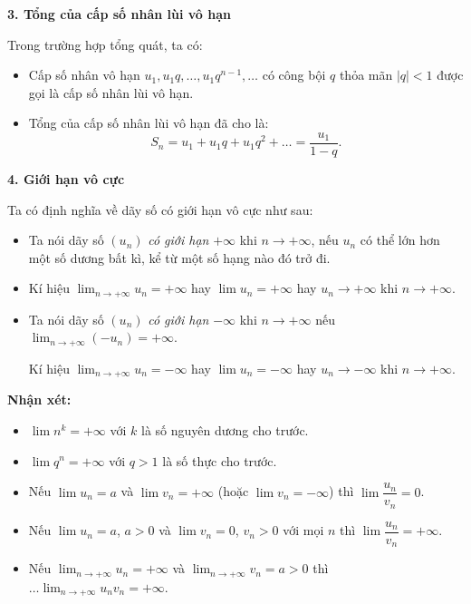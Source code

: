 \documentclass[12pt,a4paper]{extarticle}
\begin{document}
\noindent\textbf{3. Tổng của cấp số nhân lùi vô hạn}

\noindent Trong trường hợp tổng quát, ta có:
\begin{itemize}
    \item Cấp số nhân vô hạn $u_1, u_1q, \dots, u_1q^{n-1}, \dots$ có công bội $q$ thỏa mãn $|q| < 1$ được gọi là cấp số nhân lùi vô hạn.
    \item Tổng của cấp số nhân lùi vô hạn đã cho là:
    \[ S_n = u_1 + u_1q + u_1q^2 + \dots = \frac{u_1}{1 - q}. \]
\end{itemize}

\vspace{0.4cm}
\noindent\textbf{4. Giới hạn vô cực}

\noindent Ta có định nghĩa về dãy số có giới hạn vô cực như sau:
\begin{itemize}
    \item Ta nói dãy số $(u_n)$ \textit{có giới hạn} $+\infty$ khi $n \to +\infty$, nếu $u_n$ có thể lớn hơn một số dương bất kì, kể từ một số hạng nào đó trở đi.
    \item Kí hiệu $\lim_{n \to +\infty} u_n = +\infty$ hay $\lim u_n = +\infty$ hay $u_n \to +\infty$ khi $n \to +\infty$.
    \item Ta nói dãy số $(u_n)$ \textit{có giới hạn} $-\infty$ khi $n \to +\infty$ nếu $\lim_{n \to +\infty} (-u_n) = +\infty$.
    
    Kí hiệu $\lim_{n \to +\infty} u_n = -\infty$ hay $\lim u_n = -\infty$ hay $u_n \to -\infty$ khi $n \to +\infty$.
\end{itemize}
\vspace{0.4cm}
\noindent\textbf{Nhận xét:}
\begin{itemize}
    \item $\lim n^k = +\infty$ với $k$ là số nguyên dương cho trước.
    \item $\lim q^n = +\infty$ với $q > 1$ là số thực cho trước.
    \item Nếu $\lim u_n = a$ và $\lim v_n = +\infty$ (hoặc $\lim v_n = -\infty$) thì $\lim \dfrac{u_n}{v_n} = 0$.
    \item Nếu $\lim u_n = a$, $a > 0$ và $\lim v_n = 0$, $v_n > 0$ với mọi $n$ thì $\lim \dfrac{u_n}{v_n} = +\infty$.
    \item Nếu $\lim_{n \to +\infty} u_n = +\infty$ và $\lim_{n \to +\infty} v_n = a > 0$ thì $\dots \lim_{n \to +\infty} u_n v_n = +\infty$.
\end{itemize}
\vspace{0.3cm}
\end{document}
